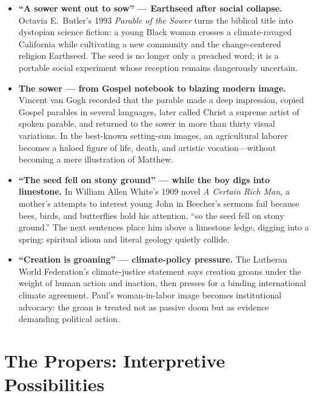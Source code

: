 {\small
\begin{itemize}[itemsep=0em,topsep=0.15em,parsep=0pt]
\item \textbf{“A sower went out to sow” --- Earthseed after social collapse.\enspace{}} Octavia E.~Butler's 1993 \emph{Parable of the Sower} turns the biblical title into dystopian science fiction: a young Black woman crosses a climate-ravaged California while cultivating a new community and the change-centered religion Earthseed. The seed is no longer only a preached word; it is a portable social experiment whose reception remains dangerously uncertain.

\item \textbf{The sower --- from Gospel notebook to blazing modern image.\enspace{}} Vincent van Gogh recorded that the parable made a deep impression, copied Gospel parables in several languages, later called Christ a supreme artist of spoken parable, and returned to the sower in more than thirty visual variations. In the best-known setting-sun images, an agricultural laborer becomes a haloed figure of life, death, and artistic vocation---without becoming a mere illustration of Matthew.

\item \textbf{“The seed fell on stony ground” --- while the boy digs into limestone.\enspace{}} In William Allen White's 1909 novel \emph{A Certain Rich Man}, a mother's attempts to interest young John in Beecher's sermons fail because bees, birds, and butterflies hold his attention, “so the seed fell on stony ground.” The next sentences place him above a limestone ledge, digging into a spring: spiritual idiom and literal geology quietly collide.

\item \textbf{“Creation is groaning” --- climate-policy pressure.\enspace{}} The Lutheran World Federation's climate-justice statement says creation groans under the weight of human action and inaction, then presses for a binding international climate agreement. Paul's woman-in-labor image becomes institutional advocacy: the groan is treated not as passive doom but as evidence demanding political action.
\end{itemize}
}

\section*{The Propers: Interpretive Possibilities}

